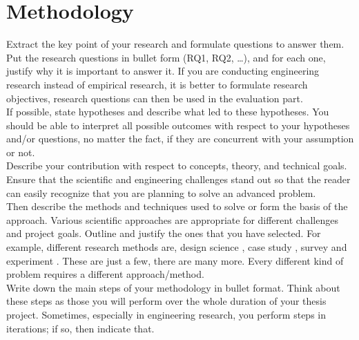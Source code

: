 \section*{Methodology}


Extract the key point of your research and formulate questions to answer them. Put the research questions in bullet form (RQ1, RQ2, …), and for each one, justify why it is important to answer it. If you are conducting engineering research instead of empirical research, it is better to formulate research objectives, research questions can then be used in the evaluation part.\\

\noindent If possible, state hypotheses and describe what led to these hypotheses. You should be able to interpret all possible outcomes with respect to your hypotheses and/or questions, no matter the fact, if they are concurrent with your assumption or not.\\

\noindent Describe your contribution with respect to concepts, theory, and technical goals. Ensure that the scientific and engineering challenges stand out so that the reader can easily recognize that you are planning to solve an advanced problem.\\

\noindent Then describe the methods and techniques used to solve or form the basis of the approach. Various scientific approaches are appropriate for different challenges and project goals. Outline and justify the ones that you have selected. For example, different research methods are, design science \cite{f99b6b96-d02d-3b52-a8ae-813e94bb93eb}, case study \cite{guideline}, survey \cite{grover1997tutorial} and experiment \cite{basili1986experimentation}. These are just a few, there are many more. Every different kind of problem requires a different approach/method.\\

\noindent Write down the main steps of your methodology in bullet format. Think about these steps as those you will perform over the whole duration of your thesis project. Sometimes, especially in engineering research, you perform steps in iterations; if so, then indicate that.
